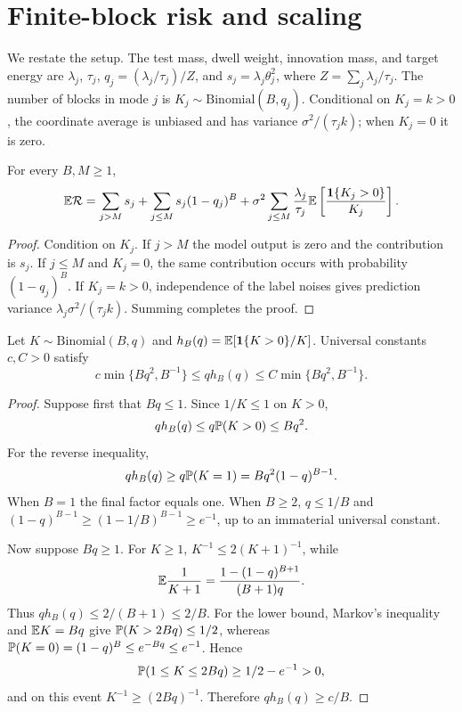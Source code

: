 \section{Finite-block risk and scaling}

We restate the setup. The test mass, dwell weight, innovation mass, and target
energy are $\lambda_j$, $\tau_j$, $q_j=(\lambda_j/\tau_j)/Z$, and
$s_j=\lambda_j\theta_j^2$, where $Z=\sum_j\lambda_j/\tau_j$. The number of
blocks in mode $j$ is $K_j\sim\mathrm{Binomial}(B,q_j)$. Conditional on
$K_j=k>0$, the coordinate average is unbiased and has variance
$\sigma^2/(\tau_jk)$; when $K_j=0$ it is zero.

\begin{theorem}
For every $B,M\ge1$,
\[
\mathbb{E}\mathcal{R}=\sum_{j>M}s_j+\sum_{j\le M}s_j(1-q_j)^B
+\sigma^2\sum_{j\le M}\frac{\lambda_j}{\tau_j}
\mathbb{E}\left[\frac{\mathbf{1}\{K_j>0\}}{K_j}\right].
\]
\end{theorem}

\begin{proof}
Condition on $K_j$. If $j>M$ the model output is zero and the contribution is
$s_j$. If $j\le M$ and $K_j=0$, the same contribution occurs with probability
$(1-q_j)^B$. If $K_j=k>0$, independence of the label noises gives prediction
variance $\lambda_j\sigma^2/(\tau_jk)$. Summing completes the proof.
\end{proof}

\begin{lemma}
Let $K\sim\mathrm{Binomial}(B,q)$ and
$h_B(q)=\mathbb{E}[\mathbf{1}\{K>0\}/K]$. Universal constants $c,C>0$ satisfy
\[
c\min\{Bq^2,B^{-1}\}\le qh_B(q)
\le C\min\{Bq^2,B^{-1}\}.
\]
\end{lemma}

\begin{proof}
Suppose first that $Bq\le1$. Since $1/K\le1$ on $K>0$,
\[
qh_B(q)\le q\mathbb{P}(K>0)\le Bq^2.
\]
For the reverse inequality,
\[
qh_B(q)\ge q\mathbb{P}(K=1)=Bq^2(1-q)^{B-1}.
\]
When $B=1$ the final factor equals one. When $B\ge2$, $q\le1/B$ and
$(1-q)^{B-1}\ge(1-1/B)^{B-1}\ge e^{-1}$, up to an immaterial universal
constant.

Now suppose $Bq\ge1$. For $K\ge1$, $K^{-1}\le2(K+1)^{-1}$, while
\[
\mathbb{E}\frac1{K+1}
=\frac{1-(1-q)^{B+1}}{(B+1)q}.
\]
Thus $qh_B(q)\le2/(B+1)\le2/B$. For the lower bound, Markov's inequality and
$\mathbb{E} K=Bq$ give $\mathbb{P}(K>2Bq)\le1/2$, whereas
$\mathbb{P}(K=0)=(1-q)^B\le e^{-Bq}\le e^{-1}$. Hence
\[
\mathbb{P}(1\le K\le2Bq)\ge1/2-e^{-1}>0,
\]
and on this event $K^{-1}\ge(2Bq)^{-1}$. Therefore $qh_B(q)\ge c/B$.
\end{proof}

